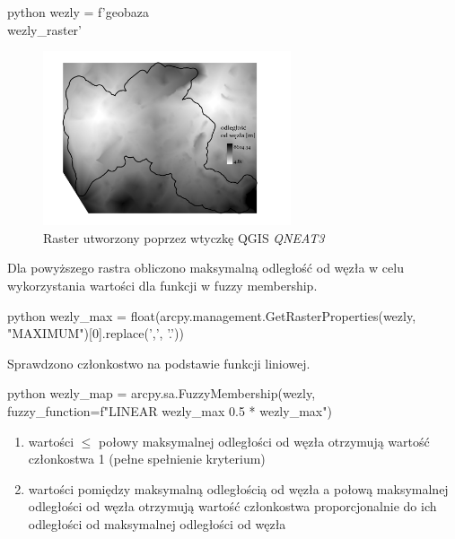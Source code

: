 \documentclass{article}
\begin{document}
\begin{mintedbox}{python}
wezly = f'{geobaza}\\wezly_raster'
\end{mintedbox}

\begin{figure}[H]
    \centering
    \includegraphics[width=0.65\textwidth]{img/kryterium7-wezly.jpg}
    \caption{Raster utworzony poprzez wtyczkę QGIS  \textit{QNEAT3}}
\end{figure}
\vspace{10pt}

Dla powyższego rastra obliczono maksymalną odległość od węzła w celu wykorzystania wartości dla funkcji w fuzzy membership.
\vspace{5pt}

\begin{mintedbox}{python}
wezly_max = float(arcpy.management.GetRasterProperties(wezly, "MAXIMUM")[0].replace(',', '.'))
\end{mintedbox}
\vspace{10pt}

Sprawdzono członkostwo na podstawie funkcji liniowej.
\vspace{5pt}

\begin{mintedbox}{python}
wezly_map = arcpy.sa.FuzzyMembership(wezly, fuzzy_function=f"LINEAR {wezly_max} {0.5 * wezly_max}")
\end{mintedbox}
\vspace{5pt}

\begin{enumerate}[label=•]
    \item wartości \( \leq \) połowy maksymalnej odległości od węzła otrzymują wartość członkostwa 1 (pełne spełnienie kryterium)
    \item wartości pomiędzy maksymalną odległością od węzła a połową maksymalnej odległości od węzła otrzymują wartość członkostwa proporcjonalnie do ich odległości od maksymalnej odległości od węzła
\end{enumerate}
\end{document}
